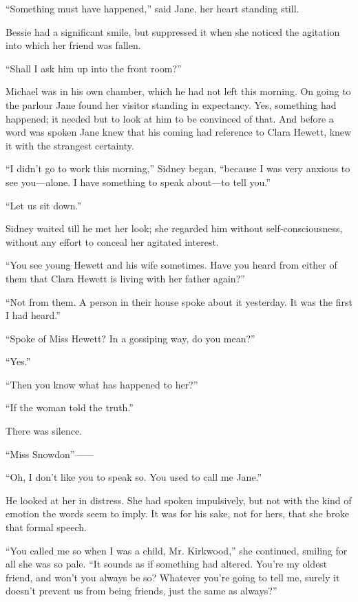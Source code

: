``Something must have happened,'' said Jane, her heart standing still.

Bessie had a significant smile, but suppressed it when she noticed the
agitation into which her friend was fallen.

``Shall I ask him up into the front room?''

Michael was in his own chamber, which he had not left this morning. On
going to the parlour Jane found her visitor standing in expectancy. Yes,
something had happened; it needed but to look at him to be convinced of
that. And before a word was spoken Jane knew that his coming had
reference to Clara Hewett, knew it with the strangest certainty.

``I didn't go to work this morning,'' Sidney began, ``because I was very
anxious to see {\protect\hypertarget{149}{}{}}you---alone. I have
something to speak about---to tell you.''

``Let us sit down.''

Sidney waited till he met her look; she regarded him without
self-consciousness, without any effort to conceal her agitated interest.

``You see young Hewett and his wife sometimes. Have you heard from
either of them that Clara Hewett is living with her father again?''

``Not from them. A person in their house spoke about it yesterday. It
was the first I had heard.''

``Spoke of Miss Hewett? In a gossiping way, do you mean?''

``Yes.''

``Then you know what has happened to her?''

``If the woman told the truth.''

There was silence.

``Miss Snowdon''{{------}}

``Oh, I don't like you to speak so. You used to call me Jane.''

He looked at her in distress. She had spoken impulsively, but not with
the kind of emotion the words seem to imply. It was for his
{\protect\hypertarget{150}{}{}}sake, not for hers, that she broke that
formal speech.

``You called me so when I was a child, Mr. Kirkwood,'' she continued,
smiling for all she was so pale. ``It sounds as if something had
altered. You're my oldest friend, and won't you always be so? Whatever
you're going to tell me, surely it doesn't prevent us from being
friends, just the same as always?''

